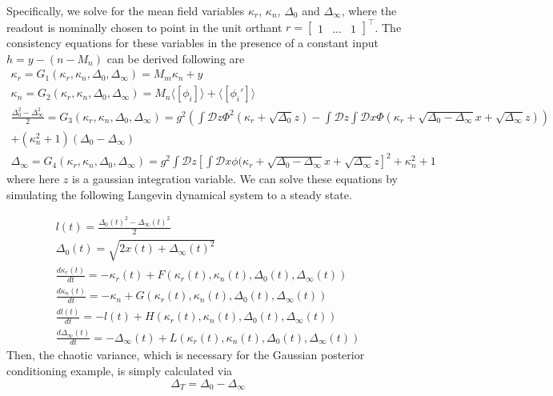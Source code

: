 \documentclass[11pt]{article}
\begin{document}
Specifically, we solve for the mean field variables $\kappa_r$, $\kappa_n$, $\Delta_0$ and $\Delta_\infty$, where the readout is nominally chosen to point in the unit orthant $r = \begin{bmatrix} 1 & ... & 1 \end{bmatrix}^\top$.  The consistency equations for these variables in the presence of a constant input $h = y - (n - M_n)$ can be derived following \cite{mastrogiuseppe2018linking} are
{\small
\begin{equation}
\begin{split}
\kappa_r = G_1(\kappa_r, \kappa_n, \Delta_0, \Delta_\infty) = M_m \kappa_n + y \\
\kappa_n = G_2(\kappa_r, \kappa_n, \Delta_0, \Delta_\infty) = M_n \langle \left[ \phi_i \right] \rangle + \langle \left[ \phi_i' \right] \rangle \\
\frac{\Delta_0^2-\Delta_\infty^2}{2} = G_3(\kappa_r, \kappa_n, \Delta_0, \Delta_\infty) = g^2 \left( \int \mathcal{D}z \Phi^2(\kappa_r + \sqrt{\Delta_0}z) - \int \mathcal{D}z \int \mathcal{D}x \Phi(\kappa_r + \sqrt{\Delta_0 - \Delta_\infty}x + \sqrt{\Delta_\infty}z)  \right) \\
+ (\kappa_n^2  + 1)(\Delta_0-\Delta_\infty) \\
\Delta_\infty = G_4(\kappa_r, \kappa_n, \Delta_0, \Delta_\infty)  = g^2 \int \mathcal{D}z \left[ \int \mathcal{D}x \phi(\kappa_r + \sqrt{\Delta_0 - \Delta_\infty}x + \sqrt{\Delta_\infty}z \right]^2 + \kappa_n^2 + 1
\end{split} 
\end{equation}
}
where here $z$ is a gaussian integration variable. We can solve these equations by simulating the following Langevin dynamical system to a steady state.

\begin{equation}
\begin{split}
l(t) = \frac{\Delta_0(t)^2-\Delta_\infty(t)^2}{2} \\
\Delta_0(t) = \sqrt{2x(t) + \Delta_\infty(t)^2} \\
\frac{d \kappa_r(t)}{dt}  = -\kappa_r(t) + F(\kappa_r(t), \kappa_n(t), \Delta_0(t), \Delta_\infty(t)) \\
\frac{d \kappa_n(t)}{dt} = -\kappa_n + G(\kappa_r(t), \kappa_n(t), \Delta_0(t), \Delta_\infty(t)) \\
\frac{d l(t)}{dt}  = -l(t) + H(\kappa_r(t), \kappa_n(t), \Delta_0(t), \Delta_\infty(t)) \\
\frac{d \Delta_\infty(t)}{dt}  = -\Delta_\infty(t) + L(\kappa_r(t), \kappa_n(t), \Delta_0(t), \Delta_\infty(t))
\end{split}
\end{equation}
Then, the chaotic variance, which is necessary for the Gaussian posterior conditioning example, is simply calculated via
\begin{equation}
\Delta_T = \Delta_0 - \Delta_\infty
\end{equation}
\end{document}
